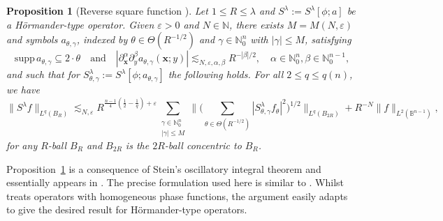 \documentclass[reqno]{amsart}
\numberwithin{equation}{section}
\newcommand{\B}{\mathbb{B}}
\newcommand{\N}{\mathbb{N}}
\newcommand{\bx}{\mathbf{x}}
\theoremstyle{plain}
\newtheorem{proposition}[theorem]{Proposition}
\theoremstyle{definition}
\newcommand{\supp}{\mathrm{supp}\,}
\begin{document}
\begin{proposition}[Reverse square function \cite{Bourgain1991}]\label{prop: vc sf} Let $1 \leq R \leq \lambda$ and $S^{\lambda} := S^{\lambda}[\phi;a]$ be a H\"ormander-type operator. Given $\varepsilon > 0$ and $N \in \N$, there exists $M = M(N,\varepsilon)$ and symbols $a_{\theta, \gamma}$, indexed by $\theta \in \Theta(R^{-1/2})$ and $\gamma \in \N_0^n$ with $|\gamma| \leq M$, satisfying 
\begin{equation*}
\supp a_{\theta, \gamma} \subseteq 2 \cdot \theta \quad \textrm{and} \quad |\partial_{\bx}^{\alpha} \partial_y^{\beta} a_{\theta, \gamma}(\bx;y)| \lesssim_{N, \varepsilon, \alpha, \beta} R^{-|\beta|/2}, \quad \alpha \in \N_0^n, \beta \in \N_0^{n-1},
\end{equation*}
and such that for $S_{\theta, \gamma}^{\lambda} := S^{\lambda}[\phi; a_{\theta, \gamma}]$ the following holds. For all $2 \leq q \leq q(n)$, we have
    \begin{equation}\label{eq: vc sf}
    \|S^{\lambda}f\|_{L^q(B_R)} \lesssim_{N,\varepsilon} R^{\frac{n-1}{4}(\frac{1}{2} - \frac{1}{q}) + \varepsilon} \sum_{\substack{ \gamma \in \N_0^n \\ |\gamma| \leq M}} \Big\|\big(\sum_{\theta \in \Theta(R^{-1/2})} |S_{\theta, \gamma}^{\lambda}f_{\theta}|^2 \big)^{1/2}\Big\|_{L^q(B_{2R})} + R^{-N} \|f\|_{L^2(\B^{n-1})},
\end{equation}
for any $R$-ball $B_R$ and $B_{2R}$ is the $2R$-ball concentric to $B_R$.   
\end{proposition}

Proposition~\ref{prop: vc sf} is a consequence of Stein's oscillatory integral theorem \cite{Stein1986} and essentially appears in \cite{Bourgain1991}. The precise formulation used here is similar to \cite[Proposition 8.2.2]{Sogge2017}. Whilst \cite[Proposition 8.2.2]{Sogge2017} treats operators with homogeneous phase functions, the argument easily adapts to give the desired result for H\"ormander-type operators. 
 


\end{document}
